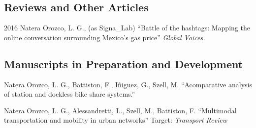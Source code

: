 \documentclass{academiccv}
\begin{document}
\subsection*{Reviews and Other Articles}
\begin{tablist}
	\item[2016] \tab Natera Orozco, L. G., (as Signa\_Lab) \enquote{Battle of the hashtags: Mapping the online conversation surrounding Mexico's gas price} \textit{Global Voices.}
\end{tablist}



\subsection*{Manuscripts in Preparation and Development}
\begin{tablist}
	\item[\the\year] Natera Orozco, L. G., Battiston, F., I\~niguez, G., Szell, M. \enquote{Acomparative analysis of station and dockless bike share systems.} 
	\item[\the\year] Natera Orozco, L. G., Alessandretti, L., Szell, M., Battiston, F. \enquote{Multimodal transportation and mobility in urban networks} Target: \textit{Transport Review}
\end{tablist}
\end{document}
